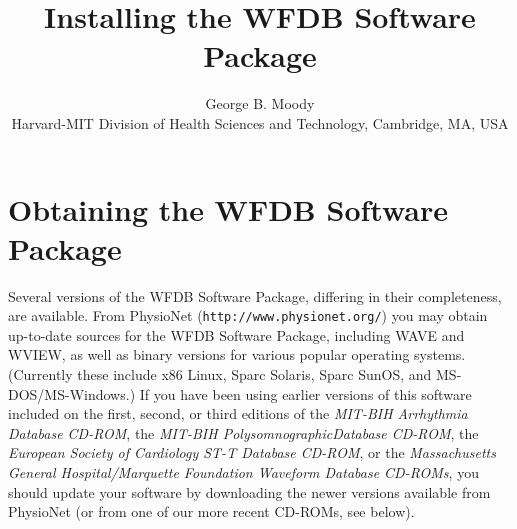 
\title{Installing the WFDB Software Package}
\author{George B. Moody\\
Harvard-MIT Division of Health Sciences and Technology, Cambridge, MA, USA}
\date{}


\topmargin -0.5625in
\oddsidemargin -0.25in
\evensidemargin -0.25in
\def\columnsep{0.3125 in}
\def\textwidth{6.875 in}
\def\textheight{224 mm}
\flushbottom
\setcounter{page}{105}

\maketitle

\section*{Obtaining the WFDB Software Package}

Several versions of the WFDB Software Package, differing in their completeness,
are available.  From PhysioNet ({\tt http://www.physionet.org/}) you may obtain
up-to-date sources for the WFDB Software Package, including WAVE and WVIEW, as
well as binary versions for various popular operating systems.  (Currently
these include x86 Linux, Sparc Solaris, Sparc SunOS, and MS-DOS/MS-Windows.)
If you have been using earlier versions of this software included on the first,
second, or third editions of the {\it MIT-BIH Arrhythmia Database CD-ROM}, the
{\it MIT-BIH PolysomnographicDatabase CD-ROM}, the {\it European Society of
Cardiology ST-T Database CD-ROM}, or the {\it Massachusetts General
Hospital/Marquette Foundation Waveform Database CD-ROMs}, you should update
your software by downloading the newer versions available from PhysioNet (or
from one of our more recent CD-ROMs, see below).

